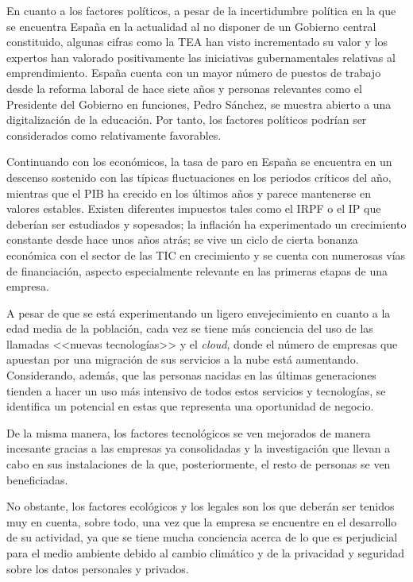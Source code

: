En cuanto a los factores políticos, a pesar de la incertidumbre política en la que se encuentra España en la actualidad al no disponer de un Gobierno central constituido, algunas cifras como la \acs{TEA} han visto incrementado su valor y los expertos han valorado positivamente las iniciativas gubernamentales relativas al emprendimiento. España cuenta con un mayor número de puestos de trabajo desde la reforma laboral de hace siete años y personas relevantes como el Presidente del Gobierno en funciones, Pedro Sánchez, se muestra abierto a una digitalización de la educación. Por tanto, los factores políticos podrían ser considerados como relativamente favorables.

Continuando con los económicos, la tasa de paro en España se encuentra en un descenso sostenido con las típicas fluctuaciones en los periodos críticos del año, mientras que el \acs{PIB} ha crecido en los últimos años y parece mantenerse en valores estables. Existen diferentes impuestos tales como el \acs{IRPF} o el \acs{IP} que deberían ser estudiados y sopesados; la inflación ha experimentado un crecimiento constante desde hace unos años atrás; se vive un ciclo de cierta bonanza económica con el sector de las \acs{TIC} en crecimiento y se cuenta con numerosas vías de financiación, aspecto especialmente relevante en las primeras etapas de una empresa.



A pesar de que se está experimentando un ligero envejecimiento en cuanto a la edad media de la población, cada vez se tiene más conciencia del uso de las llamadas <<nuevas tecnologías>> y el \textit{cloud}, donde el número de empresas que apuestan por una migración de sus servicios a la nube está aumentando. Considerando, además, que las personas nacidas en las últimas generaciones tienden a hacer un uso más intensivo de todos estos servicios y tecnologías, se identifica un potencial en estas que representa una oportunidad de negocio.

De la misma manera, los factores tecnológicos se ven mejorados de manera incesante gracias a las empresas ya consolidadas y la investigación que llevan a cabo en sus instalaciones de la que, posteriormente, el resto de personas se ven beneficiadas.

No obstante, los factores ecológicos y los legales son los que deberán ser tenidos muy en cuenta, sobre todo, una vez que la empresa se encuentre en el desarrollo de su actividad, ya que se tiene mucha conciencia acerca de lo que es perjudicial para el medio ambiente debido al cambio climático y de la privacidad y seguridad sobre los datos personales y privados.


